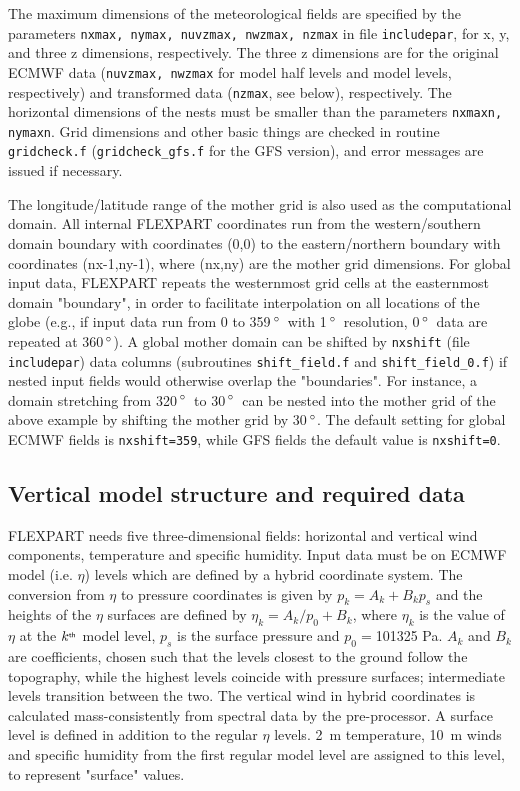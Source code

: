 \documentclass{egu}                  %
\newcommand{\degreee}{{$\, \rm ^{\circ}$}}
\newcommand{\degreen}{{$\, \rm ^{\circ}$~}}
\begin{document}
The maximum dimensions of the meteorological fields are specified by the
parameters \verb|nxmax, nymax, nuvzmax, nwzmax, nzmax| in file
\verb|includepar|, for x, y, and three z dimensions, respectively.  The three z
dimensions are for the original ECMWF data (\verb|nuvzmax, nwzmax| for model
half levels and model levels, respectively) and transformed data (\verb|nzmax|,
see below), respectively.  The horizontal dimensions of the nests must be
smaller than the parameters \verb|nxmaxn, nymaxn|.  Grid dimensions and other
basic things are checked in routine \verb|gridcheck.f| (\verb|gridcheck_gfs.f|
for the GFS version), and error messages are issued if necessary.

The longitude/latitude range of the mother grid is also used as the
computational domain.  All internal FLEXPART coordinates run from the
western/southern domain boundary with coordinates (0,0) to the eastern/northern
boundary with coordinates (nx-1,ny-1), where (nx,ny) are the mother grid
dimensions.  For global input data, FLEXPART repeats the westernmost grid cells
at the easternmost domain "boundary", in order to facilitate interpolation on
all locations of the globe (e.g., if input data run from 0 to 359\degreen with
1\degreen resolution, 0\degreen data are repeated at 360\degreee).  A global
mother domain can be shifted by \verb|nxshift| (file \verb|includepar|) data
columns (subroutines \verb|shift_field.f| and \verb|shift_field_0.f|) if nested
input fields would otherwise overlap the "boundaries".  For instance, a domain
stretching from 320\degreen to 30\degreen can be nested into the mother grid of
the above example by shifting the mother grid by 30\degreee. The default setting
for global ECMWF fields is \verb|nxshift=359|, while GFS fields the default
value is \verb|nxshift=0|.

\subsection{Vertical model structure and required data}

FLEXPART needs five three-dimensional fields: horizontal and vertical wind
components, temperature and specific humidity.  Input data must be on ECMWF
model (i.e.  $\eta$) levels which are defined by a hybrid coordinate system.
The conversion from $\eta$ to pressure coordinates is given by $p_k=A_k+B_kp_s$
and the heights of the $\eta$ surfaces are defined by $\eta_k=A_k/p_0+B_k$,
where $\eta_k$ is the value of $\eta$ at the $k^{\rm_{th}}$ model level, $p_s$
is the surface pressure and $p_0=$101325 Pa.  $A_k$ and $B_k$ are coefficients,
chosen such that the levels closest to the ground follow the topography, while
the highest levels coincide with pressure surfaces; intermediate levels
transition between the two.  The vertical wind in hybrid coordinates is
calculated mass-consistently from spectral data by the pre-processor.  A
surface level is defined in addition to the regular $\eta$ levels.  2~m
temperature, 10~m winds and specific humidity from the first regular model
level are assigned to this level, to represent "surface" values.
\end{document}
